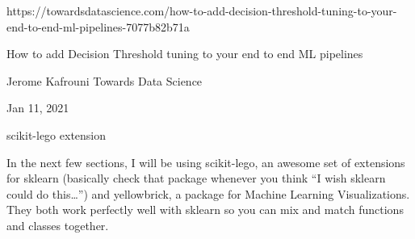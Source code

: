 https://towardsdatascience.com/how-to-add-decision-threshold-tuning-to-your-end-to-end-ml-pipelines-7077b82b71a

How to add Decision Threshold tuning to your end to end ML pipelines

Jerome Kafrouni
Towards Data Science

Jan 11, 2021

scikit-lego extension

In the next few sections, I will be using scikit-lego, an awesome set of extensions for sklearn (basically check that package whenever you think “I wish sklearn could do this…”) and yellowbrick, a package for Machine Learning Visualizations. They both work perfectly well with sklearn so you can mix and match functions and classes together.